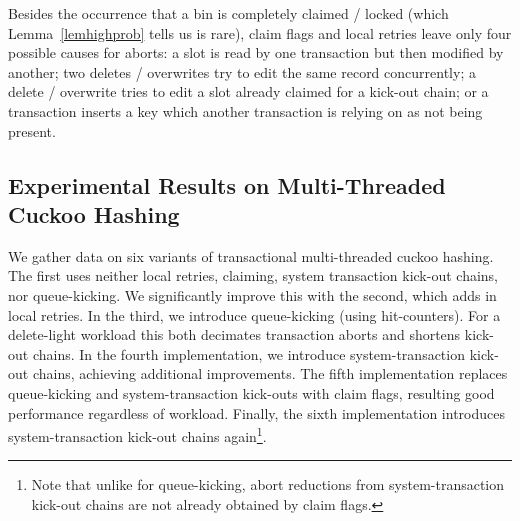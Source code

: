 \documentclass{sig-alternate-05-2015}
\begin{document}
Besides the occurrence that a bin is completely claimed / locked
(which Lemma~\ref{lemhighprob} tells us is rare), claim flags and
local retries leave only four possible causes for aborts: a slot is read by one transaction but then modified by another;
two deletes / overwrites try to edit the same record concurrently; a
 delete / overwrite tries to edit a slot already claimed for a
 kick-out chain; or a transaction inserts a key which another transaction
 is relying on as not being present.











































\subsection{Experimental Results on Multi-Threaded Cuckoo Hashing}\label{secconcurrentexp}

We gather data on six variants of transactional multi-threaded cuckoo
hashing. The first uses neither local retries, claiming, system
transaction kick-out chains, nor queue-kicking. We significantly
improve this with the second, which adds in local retries. In the
third, we introduce queue-kicking (using hit-counters). For a
delete-light workload this both decimates transaction aborts and
shortens kick-out chains. In the fourth implementation, we introduce
system-transaction kick-out chains, achieving additional
improvements. The fifth implementation replaces queue-kicking and
system-transaction kick-outs with claim flags, resulting good
performance regardless of workload. Finally, the sixth implementation
introduces system-transaction kick-out chains again\footnote{Note that
 unlike for queue-kicking, abort reductions from system-transaction
  kick-out chains are not already obtained by claim flags.}.
\end{document}
